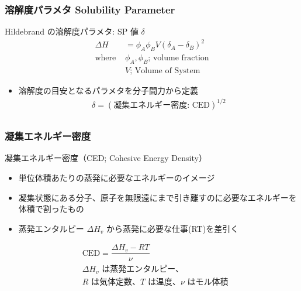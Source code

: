 \documentclass[unicode,12pt]{beamer}%
\begin{document}
\begin{frame}
	\frametitle{溶解度パラメタ Solubility Parameter}
		\begin{block}{Hildebrand の溶解度パラメタ: SP 値 $\delta$}
			\vspace{-1\baselineskip}
			\begin{align*}
				\Delta H &= \phi_A \phi_B V (\delta_A -\delta_B)^2 \\
				\text{where }& \phi_A, \phi_B \text{; volume fraction}\\
				& V \text{; Volume of System}
			\end{align*}
			\vspace{-1\baselineskip}
			\begin{itemize}
				\item 溶解度の目安となるパラメタを分子間力から定義
				\vspace{-.5\baselineskip}
				\begin{align*}
					\delta = (\text{凝集エネルギー密度: CED})^{1/2} \\
				\end{align*}
			\end{itemize}
			\vspace{-8mm}
			\centering
		\end{block}
\end{frame}

\begin{frame}
	\frametitle{凝集エネルギー密度}
		\begin{exampleblock}{凝集エネルギー密度（CED; Cohesive Energy Density）}
			\begin{itemize}
				\item 単位体積あたりの蒸発に必要なエネルギーのイメージ
				\item 凝集状態にある分子、原子を無限遠にまで引き離すのに必要なエネルギーを体積で割ったもの
				\item 蒸発エンタルピー $\Delta H_v$ から蒸発に必要な仕事(RT)を差引く
			\end{itemize}
			\vspace{-1\baselineskip}
			\begin{align*}
				&\text{CED} = \dfrac{\Delta H_v - RT}{\nu}\\
				&\text{$\Delta H_v$ は蒸発エンタルピー、}\\
				&\text{$R$ は気体定数、$T$ は温度、$\nu$ はモル体積}
			\end{align*}
		\end{exampleblock}
\end{frame}
\end{document}
